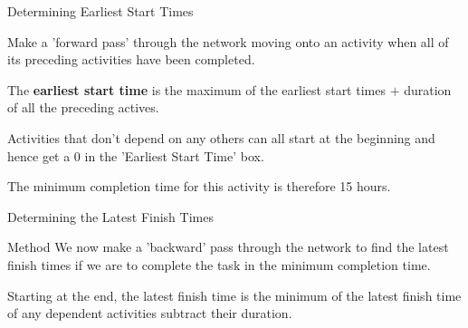 \documentclass[8pt]{beamer}
\begin{document}
\begin{frame}{Determining Earliest Start Times}
	\begin{definition}
		Make a 'forward pass' through the network moving onto an activity when all of its preceding activities have been completed.

		The \textbf{earliest start time} is the  maximum of the earliest start times $+$ duration of all the preceding actives.
	\end{definition}


\begin{center}
\end{center}

Activities that don't depend on any others can all start at the beginning and hence get a 0 in the 'Earliest Start Time' box.

The minimum completion time for this activity is therefore 15 hours.

\end{frame}

\begin{frame}{Determining the Latest Finish Times}
	\begin{block}{Method}
		We now make a 'backward' pass through the network to find the latest finish times if we are to complete the task in the minimum completion time.

		Starting at the end, the latest finish time is the minimum of the latest finish time of any dependent activities subtract their duration. 
	\end{block}




\begin{center}
\end{center}


\end{frame}
\end{document}
